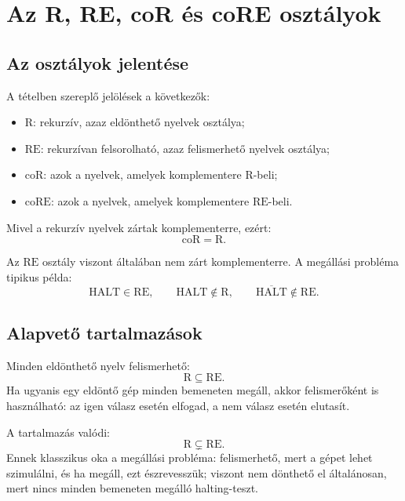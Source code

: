 
\section{Az R, RE, coR és coRE osztályok}

\subsection{Az osztályok jelentése}

A tételben szereplő jelölések a következők:

\begin{itemize}
  \item $\mathrm{R}$: rekurzív, azaz eldönthető nyelvek osztálya;
  \item $\mathrm{RE}$: rekurzívan felsorolható, azaz felismerhető nyelvek osztálya;
  \item $\mathrm{coR}$: azok a nyelvek, amelyek komplementere $\mathrm{R}$-beli;
  \item $\mathrm{coRE}$: azok a nyelvek, amelyek komplementere $\mathrm{RE}$-beli.
\end{itemize}

Mivel a rekurzív nyelvek zártak komplementerre, ezért:
\[
  \mathrm{coR}=\mathrm{R}.
\]

Az $\mathrm{RE}$ osztály viszont általában nem zárt komplementerre. A megállási probléma tipikus példa:
\[
  \mathrm{HALT}\in\mathrm{RE},
  \qquad
  \mathrm{HALT}\notin\mathrm{R},
  \qquad
  \overline{\mathrm{HALT}}\notin\mathrm{RE}.
\]



\subsection{Alapvető tartalmazások}

Minden eldönthető nyelv felismerhető:
\[
  \mathrm{R}\subseteq\mathrm{RE}.
\]
Ha ugyanis egy eldöntő gép minden bemeneten megáll, akkor felismerőként is használható: az igen válasz esetén elfogad, a nem válasz esetén elutasít.

A tartalmazás valódi:
\[
  \mathrm{R}\subsetneq\mathrm{RE}.
\]
Ennek klasszikus oka a megállási probléma: felismerhető, mert a gépet lehet szimulálni, és ha megáll, ezt észrevesszük; viszont nem dönthető el általánosan, mert nincs minden bemeneten megálló halting-teszt.

